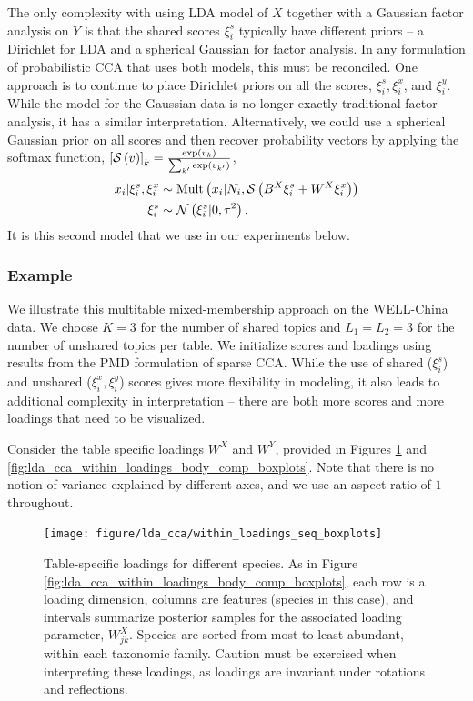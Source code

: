 \documentclass{article}
\begin{document}
The only complexity with using LDA model of $X$ together with a Gaussian factor
analysis on $Y$ is that the shared scores $\xi_{i}^{s}$ typically have different
priors -- a Dirichlet for LDA and a spherical Gaussian for factor analysis. In
any formulation of probabilistic CCA that uses both models, this must be
reconciled. One approach is to continue to place Dirichlet priors on all the
scores, $\xi_{i}^s, \xi_{i}^x$, and $\xi_{i}^y$. While the model for the
Gaussian data is no longer exactly traditional factor analysis, it has a similar
interpretation. Alternatively, we could use a spherical Gaussian prior on all
scores and then recover probability vectors by applying the softmax function,
$\left[\mathcal{S}\left(v\right)\right]_{k} =
\frac{\operatorname{exp}\left(v_{k}\right)}{\sum_{k^{\prime}}\operatorname{exp}\left(v_{k^{\prime}}\right)}$,
\begin{align*}
  x_{i} \vert \xi_{i}^{s}, \xi_{i}^{x} &\sim \textnormal{Mult}\left(x_{i} \vert N_{i},
  \mathcal{S}\left(B^{X} \xi_{i}^{s} + W^{X} \xi_{i}^{x}\right)\right) \\
  \xi_{i}^{s} &\sim \mathcal{N}\left(\xi_i^s \vert 0, \tau^{2}\right).
\end{align*}
It is this second model that we use in our experiments below.

\subsubsection{Example}
\label{subsubsec:lda_cca_example}

We illustrate this multitable mixed-membership approach on the WELL-China data.
We choose $K = 3$ for the number of shared topics and $L_{1} = L_{2} = 3$ for
the number of unshared topics per table. We initialize scores and loadings using
results from the PMD formulation of sparse CCA. While the use of shared
($\xi_{i}^{s}$) and unshared ($\xi_{i}^{x}, \xi_{i}^{y}$) scores gives more
flexibility in modeling, it also leads to additional complexity in
interpretation -- there are both more scores and more loadings that need to be
visualized.

Consider the table specific loadings $W^{X}$ and $W^{Y}$, provided in Figures
\ref{fig:lda_cca_within_loadings_seq_boxplots} and
\ref{fig:lda_cca_within_loadings_body_comp_boxplots}. Note that there is no
notion of variance explained by different axes, and we use an aspect ratio of
$1$ throughout.

\begin{figure}
  \centering
  \texttt{[image: figure/lda\_cca/within\_loadings\_seq\_boxplots]}
  \caption{Table-specific loadings for different species. As in Figure
    \ref{fig:lda_cca_within_loadings_body_comp_boxplots}, each row is a loading
    dimension, columns are features (species in this case), and intervals
    summarize posterior samples for the associated loading parameter,
    $W^{X}_{jk}$. Species are sorted from most to least abundant, within each
    taxonomic family. Caution must be exercised when interpreting these
    loadings, as loadings are invariant under rotations and
    reflections. \label{fig:lda_cca_within_loadings_seq_boxplots}}
\end{figure}
\end{document}
